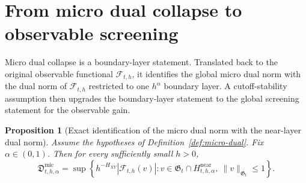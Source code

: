 \documentclass[11pt,a4paper]{amsart}
\theoremstyle{plain}
\newtheorem{proposition}[theorem]{Proposition}
\theoremstyle{definition}
\theoremstyle{remark}
\begin{document}
\section{From micro dual collapse to observable screening}
\label{sec:screening}

Micro dual collapse is a boundary-layer statement.  Translated back to the original observable
functional \(\mathcal F_{t,h}\), it identifies the global micro dual norm with the dual norm of
\(\mathcal F_{t,h}\) restricted to one \(h^\alpha\) boundary layer.  A cutoff-stability assumption
then upgrades the boundary-layer statement to the global screening statement for the observable
gain.

\begin{proposition}[Exact identification of the micro dual norm with the near-layer dual norm]
\label{prop:micro-near-dual}
Assume the hypotheses of Definition~\ref{def:micro-dual}. Fix \(\alpha\in(0,1)\). Then for every
sufficiently small \(h>0\),
\begin{equation}\label{eq:micro-near-dual}
\mathfrak D_{t,h,\alpha}^{\mathrm{mic}}
=
\sup\left\{
h^{-H_{XY}}\left|\mathcal F_{t,h}(v)\right|:
v\in\mathfrak G_t\cap H_{t,h,\alpha}^{\mathrm{near}},
\ \|v\|_{\mathfrak G_t}\le1
\right\}.
\end{equation}
\end{proposition}
\end{document}
